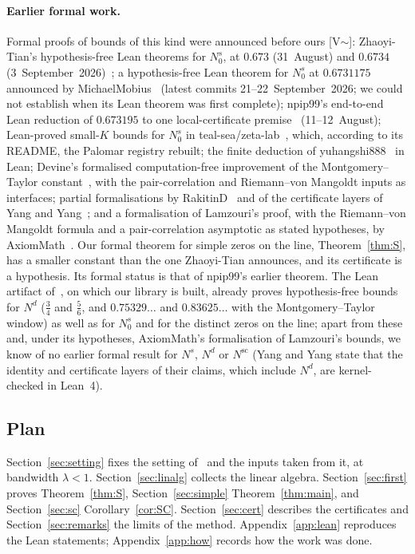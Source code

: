 \paragraph{Earlier formal work.} Formal proofs of bounds of this kind were announced before ours [V$\sim$]: Zhaoyi-Tian's
hypothesis-free Lean theorems for $N_0^s$, at $0.673$ (31~August) and $0.6734$ (3~September~2026)~\cite{ZhaoyiTian}; a hypothesis-free Lean
theorem for $N_0^s$ at $0.6731175$ announced by \mbox{MichaelMobius}~\cite{Hurtado} (latest commits 21--22~September~2026; we could not
establish when its Lean theorem was first complete); \mbox{npip99}'s end-to-end Lean reduction of
$0.673195$ to one local-certificate premise~\cite{npip99} (11--12~August); Lean-proved small-$K$ bounds for $N_0^s$ in
teal-sea/zeta-lab~\cite{tealsea}, which, according to its README, the Palomar registry rebuilt; the finite deduction of \mbox{yuhangshi888}~\cite{yuhangshi} in Lean; Devine's
formalised computation-free improvement of the Montgomery--Taylor constant~\cite{Devine22287432}, with the pair-correlation and
Riemann--von Mangoldt inputs as interfaces; partial formalisations by \mbox{RakitinD}~\cite{Rakitin} and of the certificate layers of Yang and
Yang~\cite{YY1,YY2}; and a formalisation of Lamzouri's proof, with the Riemann--von Mangoldt formula and a pair-correlation asymptotic as
stated hypotheses, by \mbox{AxiomMath}~\cite{AxiomMath}. Our formal theorem for simple zeros on the line, Theorem~\ref{thm:S}, has a smaller constant
than the one Zhaoyi-Tian announces, and its certificate is a hypothesis. Its formal status is that of \mbox{npip99}'s earlier theorem. The Lean artifact of~\cite{AF}, on which our
library is built, already proves hypothesis-free bounds for $N^d$ ($\frac34$ and $\frac56$, and $0.75329\ldots$ and
$0.83625\ldots$ with the Montgomery--Taylor window) as well as for $N_0^s$ and for the distinct zeros on the line; apart from these and, under
its hypotheses, \mbox{AxiomMath}'s formalisation of Lamzouri's bounds, we know of no earlier formal result for $N^s$, $N^d$ or $N^{\mathrm{sc}}$
(Yang and Yang state that the identity and certificate layers of their claims, which include $N^d$, are kernel-checked in Lean~4).

\subsection{Plan}
Section~\ref{sec:setting} fixes the setting of~\cite{AF} and the inputs taken from it, at bandwidth $\lambda<1$. Section~\ref{sec:linalg}
collects the linear algebra. Section~\ref{sec:first} proves Theorem~\ref{thm:S}, Section~\ref{sec:simple} Theorem~\ref{thm:main}, and
Section~\ref{sec:sc} Corollary~\ref{cor:SC}. Section~\ref{sec:cert} describes the certificates and Section~\ref{sec:remarks} the limits of the
method. Appendix~\ref{app:lean} reproduces the Lean statements; Appendix~\ref{app:how} records how the work was done.
